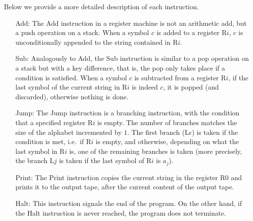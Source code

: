\documentclass[a4paper]{article}
\newcommand{\reg}[1]{\mathrm{R}#1}
\newcommand{\lbl}[1]{\mathrm{L}#1}
\begin{document}
Below we provide a more detailed description of each instruction.
\begin{itemize}
\item[Add:] The Add instruction in a register machine is not an arithmetic add, but a push operation on a stack. When a symbol $c$ is added to a register $\reg{i}$, $c$ is unconditionally appended to the string contained in $\reg{i}$.
\item[Sub:] Analogously to Add, the Sub instruction is similar to a pop operation on a stack but with a key difference, that is, the pop only takes place if a condition is satisfied. When a symbol $c$ is subtracted from a register $\reg{i}$, if the last symbol of the current string in $\reg{i}$ is indeed $c$, it is popped (and discarded), otherwise nothing is done.
\item[Jump:] The Jump instruction is a branching instruction, with the condition that a specified register $\reg{i}$ is empty. The number of branches matches the size of the alphabet incremented by $1$. The first branch ($\lbl{\epsilon}$) is taken if the condition is met, i.e.\ if $\reg{i}$ is empty, and otherwise, depending on what the last symbol in $\reg{i}$ is, one of the remaining branches is taken (more precisely, the branch $\lbl{j}$ is taken if the last symbol of $\reg{i}$ is $a_j$).
\item[Print:] The Print instruction copies the current string in the register $\reg{0}$ and prints it to the output tape, after the current content of the output tape.
\item[Halt:] This instruction signals the end of the program. On the other hand, if the Halt instruction is never reached, the program does not terminate.
\end{itemize}
\end{document}
